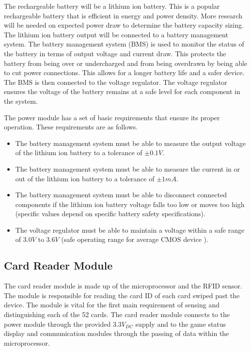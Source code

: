 \documentclass[12pt]{article}
\begin{document}
The rechargeable battery will be a lithium ion battery. This is a popular rechargeable battery that is efficient in energy and power density. More research will be needed on expected power draw to determine the battery capacity sizing. The lithium ion battery output will be connected to a battery management system. The battery management system (BMS) is used to monitor the status of the battery in terms of output voltage and current draw. This protects the battery from being over or undercharged and from being overdrawn by being able to cut power connections. This allows for a longer battery life and a safer device. The BMS is then connected to the voltage regulator. The voltage regulator ensures the voltage of the battery remains at a safe level for each component in the system.

The power module has a set of basic requirements that ensure its proper operation. These requirements are as follows.

\begin{itemize}
\item The battery management system must be able to measure the output voltage of the lithium ion battery to a tolerance of $\pm0.1V$.
\item The battery management system must be able to measure the current in or out of the lithium ion battery to a tolerance of $\pm1mA$.
\item The battery management system must be able to disconnect connected components if the lithium ion battery voltage falls too low or moves too high (specific values depend on specific battery safety specifications).
\item The voltage regulator must be able to maintain a voltage within a safe range of $3.0V$ to $3.6V$ (safe operating range for average CMOS device \cite{TI_inverter}).
\end{itemize}

\subsection{Card Reader Module}

The card reader module is made up of the microprocessor and the RFID sensor. The module is responsible for reading the card ID of each card swiped past the device. The module is vital for the first main requirement of sensing and distinguishing each of the 52 cards. The card reader module connects to the power module through the provided $3.3V_{DC}$ supply and to the game status display and communication modules through the passing of data within the microprocessor.
\end{document}
